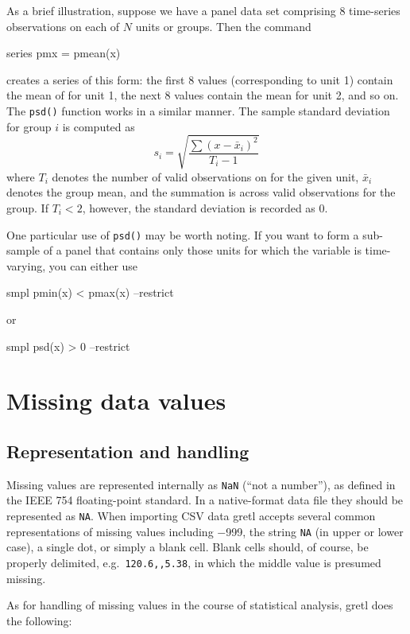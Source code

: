 As a brief illustration, suppose we have a panel data set comprising 8
time-series observations on each of $N$ units or groups.  Then the
command
%
\begin{code}
series pmx = pmean(x)
\end{code}
%
creates a series of this form: the first 8 values (corresponding to
unit 1) contain the mean of  for unit 1, the next 8 values
contain the mean for unit 2, and so on.  The \texttt{psd()} function
works in a similar manner.  The sample standard deviation for group
$i$ is computed as
\[
s_i = \sqrt{\frac{\sum(x-\bar{x}_i)^2}{T_i-1}}
\]
where $T_i$ denotes the number of valid observations on 
for the given unit, $\bar{x}_i$ denotes the group mean, and the
summation is across valid observations for the group.  If $T_i < 2$,
however, the standard deviation is recorded as 0.

One particular use of \texttt{psd()} may be worth noting.  If you want
to form a sub-sample of a panel that contains only those units for
which the variable  is time-varying, you can either use 
%
\begin{code}
smpl pmin(x) < pmax(x) --restrict
\end{code}
or
%
\begin{code}
smpl psd(x) > 0 --restrict
\end{code}

\section{Missing data values}
\label{missing-data}

\subsection{Representation and handling}

Missing values are represented internally as \verb+NaN+ (``not a
number''), as defined in the IEEE 754 floating-point standard. In a
native-format data file they should be represented as \verb+NA+. When
importing CSV data gretl accepts several common representations of
missing values including $-$999, the string \verb+NA+ (in upper or
lower case), a single dot, or simply a blank cell.  Blank cells
should, of course, be properly delimited, e.g.\ \verb+120.6,,5.38+, in
which the middle value is presumed missing.

As for handling of missing values in the course of statistical
analysis, gretl does the following:

